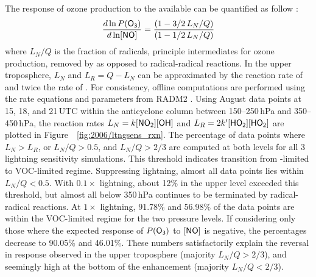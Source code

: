The response of ozone production to the available  can be quantified as follow \citep{Kleinman:2001fk}:
\begin{equation}\label{eqn:k01NO}
	\frac{d\ln P(\chem{O_3})}{d\ln[\chem{NO}]} = \frac{(1-3/2\,L_N/Q)}{(1-1/2\,L_N/Q)}
\end{equation}
where $L_N/Q$ is the fraction of  radicals, principle intermediates for ozone production, removed by
 as opposed to radical-radical reactions. In the upper troposphere, $L_N$ and $L_R=Q-L_N$ can be
approximated by the reaction rate of  and twice the rate of . For consistency,
offline computations are performed using the rate equations and parameters from RADM2
\citep[][and references therein]{Stockwell:1990ez}. Using August data points at 15, 18, and 21\,\unit{UTC} within
the anticyclone column between 150--250\,\unit{hPa} and 350--450\,\unit{hPa}, the reaction rates
$L_N=k\chem{[NO_2][OH]}$ and $L_R=2k'\chem{[HO_2][HO_2]}$ are plotted in Figure~~\ref{fig:2006/ltngsens_rxn}.
The percentage of data points where $L_N>L_R$, or $L_N/Q > 0.5$, and $L_N/Q>2/3$ are computed at both
levels for all 3 lightning sensitivity simulations. This threshold indicates transition from -limited to
VOC-limited regime. Suppressing lightning, almost all data points lies within $L_N/Q<0.5$. With $0.1\times$
lightning, about 12\% in the upper level exceeded this threshold, but almost all  below 350\,\unit{hPa}
continues to be terminated by radical-radical reactions. At $1\times$ lightning, 91.78\% and 56.98\% of the data
points are within the VOC-limited regime for the two pressure levels. If considering only those where the expected response of $P(\chem{O_3})$
to $[\chem{NO}]$ is negative, the percentages decrease to 90.05\% and 46.01\%. These numbers satisfactorily
explain the reversal in response observed in the upper troposphere (majority $L_N/Q>2/3$), and seemingly high
at the bottom of the enhancement (majority $L_N/Q<2/3$).

